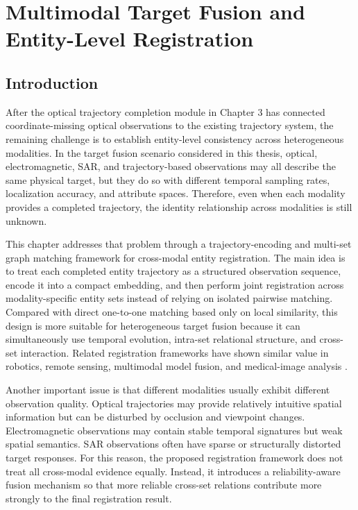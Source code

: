 \chapter{Multimodal Target Fusion and Entity-Level Registration}

\section{Introduction}
After the optical trajectory completion module in Chapter 3 has connected coordinate-missing optical observations to the existing trajectory system, the remaining challenge is to establish entity-level consistency across heterogeneous modalities. In the target fusion scenario considered in this thesis, optical, electromagnetic, SAR, and trajectory-based observations may all describe the same physical target, but they do so with different temporal sampling rates, localization accuracy, and attribute spaces. Therefore, even when each modality provides a completed trajectory, the identity relationship across modalities is still unknown.

This chapter addresses that problem through a trajectory-encoding and multi-set graph matching framework for cross-modal entity registration. The main idea is to treat each completed entity trajectory as a structured observation sequence, encode it into a compact embedding, and then perform joint registration across modality-specific entity sets instead of relying on isolated pairwise matching. Compared with direct one-to-one matching based only on local similarity, this design is more suitable for heterogeneous target fusion because it can simultaneously use temporal evolution, intra-set relational structure, and cross-set interaction. Related registration frameworks have shown similar value in robotics, remote sensing, multimodal model fusion, and medical-image analysis \cite{cattaneo2022lcdnet,maintz1998survey,zhou2025higoreg,chen2026multimodal,zhang2025optsar}.

Another important issue is that different modalities usually exhibit different observation quality. Optical trajectories may provide relatively intuitive spatial information but can be disturbed by occlusion and viewpoint changes. Electromagnetic observations may contain stable temporal signatures but weak spatial semantics. SAR observations often have sparse or structurally distorted target responses. For this reason, the proposed registration framework does not treat all cross-modal evidence equally. Instead, it introduces a reliability-aware fusion mechanism so that more reliable cross-set relations contribute more strongly to the final registration result.

